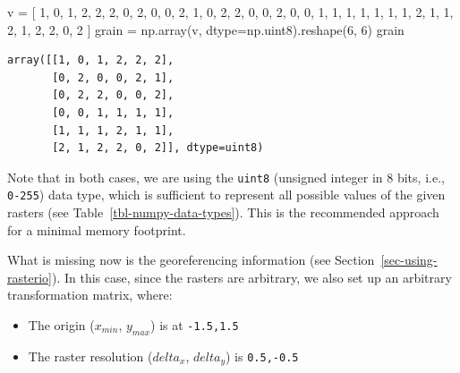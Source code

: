 \documentclass[
  letterpaper,
]{krantz}
\newenvironment{Shaded}{\begin{snugshade}}{\end{snugshade}}
\newcommand{\DecValTok}[1]{\textcolor[rgb]{0.68,0.00,0.00}{#1}}
\newcommand{\NormalTok}[1]{\textcolor[rgb]{0.00,0.23,0.31}{#1}}
\newcommand{\OperatorTok}[1]{\textcolor[rgb]{0.37,0.37,0.37}{#1}}
\providecommand{\tightlist}{%
  \setlength{\itemsep}{0pt}\setlength{\parskip}{0pt}}\usepackage{longtable,booktabs,array}
\begin{document}
\begin{Shaded}
\begin{Highlighting}[]
\NormalTok{v }\OperatorTok{=}\NormalTok{ [}
  \DecValTok{1}\NormalTok{, }\DecValTok{0}\NormalTok{, }\DecValTok{1}\NormalTok{, }\DecValTok{2}\NormalTok{, }\DecValTok{2}\NormalTok{, }\DecValTok{2}\NormalTok{, }
  \DecValTok{0}\NormalTok{, }\DecValTok{2}\NormalTok{, }\DecValTok{0}\NormalTok{, }\DecValTok{0}\NormalTok{, }\DecValTok{2}\NormalTok{, }\DecValTok{1}\NormalTok{, }
  \DecValTok{0}\NormalTok{, }\DecValTok{2}\NormalTok{, }\DecValTok{2}\NormalTok{, }\DecValTok{0}\NormalTok{, }\DecValTok{0}\NormalTok{, }\DecValTok{2}\NormalTok{, }
  \DecValTok{0}\NormalTok{, }\DecValTok{0}\NormalTok{, }\DecValTok{1}\NormalTok{, }\DecValTok{1}\NormalTok{, }\DecValTok{1}\NormalTok{, }\DecValTok{1}\NormalTok{, }
  \DecValTok{1}\NormalTok{, }\DecValTok{1}\NormalTok{, }\DecValTok{1}\NormalTok{, }\DecValTok{2}\NormalTok{, }\DecValTok{1}\NormalTok{, }\DecValTok{1}\NormalTok{, }
  \DecValTok{2}\NormalTok{, }\DecValTok{1}\NormalTok{, }\DecValTok{2}\NormalTok{, }\DecValTok{2}\NormalTok{, }\DecValTok{0}\NormalTok{, }\DecValTok{2}
\NormalTok{]}
\NormalTok{grain }\OperatorTok{=}\NormalTok{ np.array(v, dtype}\OperatorTok{=}\NormalTok{np.uint8).reshape(}\DecValTok{6}\NormalTok{, }\DecValTok{6}\NormalTok{)}
\NormalTok{grain}
\end{Highlighting}
\end{Shaded}

\begin{verbatim}
array([[1, 0, 1, 2, 2, 2],
       [0, 2, 0, 0, 2, 1],
       [0, 2, 2, 0, 0, 2],
       [0, 0, 1, 1, 1, 1],
       [1, 1, 1, 2, 1, 1],
       [2, 1, 2, 2, 0, 2]], dtype=uint8)
\end{verbatim}

Note that in both cases, we are using the \texttt{uint8} (unsigned
integer in 8 bits, i.e., \texttt{0-255}) data type, which is sufficient
to represent all possible values of the given rasters (see
Table~\ref{tbl-numpy-data-types}). This is the recommended approach for
a minimal memory footprint.

What is missing now is the georeferencing information (see
Section~\ref{sec-using-rasterio}). In this case, since the rasters are
arbitrary, we also set up an arbitrary transformation matrix, where:

\begin{itemize}
\tightlist
\item
  The origin (\(x_{min}\), \(y_{max}\)) is at \texttt{-1.5,1.5}
\item
  The raster resolution (\(delta_{x}\), \(delta_{y}\)) is
  \texttt{0.5,-0.5}
\end{itemize}
\end{document}
